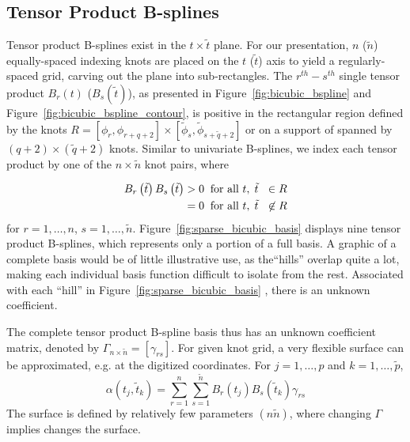 \documentclass[12pt]{article}
\newcommand*\outlineskeleton{\color{green}}
\begin{document}
\subsection{{\outlineskeleton Tensor Product B-splines}}

Tensor product B-splines exist in the $t \times \tilde{t}$ plane. For our presentation, $n$ ($\tilde{n}$) equally-spaced indexing knots are placed on the $t$ ($\tilde{t}$) axis to yield a regularly-spaced grid, carving out the plane into sub-rectangles. The $r^{th}-s^{th}$ single tensor product $B_r\left(t\right)$ ($B_s\left(\tilde{t}\right)$), as presented in Figure~\ref{fig:bicubic_bspline} and Figure~\ref{fig:bicubic_bspline_contour}, is positive in the rectangular region defined by the knots $R = \left[\phi_r, \phi_{r+q+2}\right] \times \left[\tilde{\phi}_s, \tilde{\phi}_{s+\tilde{q}+2}\right]$ or on a support of spanned by $\left(q + 2\right) \times \left(\tilde{q} + 2\right)$ knots. Similar to univariate B-splines, we index each tensor product by one of the $n\times\tilde{n}$ knot pairs, where

\begin{equation} \nonumber
\begin{split}
B_r\left(\tilde{t}\right)B_s\left(\tilde{t}\right) & > 0 \;\; \textup{for all }  t,\; \tilde{t}\;\ \in R\\
 & = 0 \;\; \textup{for all }  t,\; \tilde{t}\;\ \not\in R
\end{split}
\end{equation}
\noindent
for $r = 1,\dots, n$, $s = 1,\dots, \tilde{n}$. Figure~\ref{fig:sparse_bicubic_basis} displays nine tensor product B-splines, which represents only a portion of a full basis. A graphic of a complete basis would be of little illustrative use, as the``hills'' overlap quite a lot, making each individual basis function difficult to isolate from the rest. Associated with each ``hill'' in Figure~\ref{fig:sparse_bicubic_basis} , there is an unknown coefficient. 

The complete tensor product B-spline basis thus has an unknown coefficient matrix, denoted by $\Gamma_{n\times\tilde{n}} = \left[\gamma_{rs}\right]$. For given knot grid, a very flexible surface can be approximated, e.g. at the digitized coordinates. For $j=1,\dots,p$ and $k=1,\dots,\tilde{p}$,
\begin{equation} \label{eq:coefficient_surface_expansion}
\alpha\left(t_{j}, \tilde{t}_{k}\right) = \sum_{r=1}^n \sum_{s=1}^{\tilde{n}}  B_r\left(t_{j}\right) B_s\left(\tilde{t}_{k}\right) \gamma_{rs}
\end{equation}
\noindent
The surface is defined by relatively few parameters $\left(n \tilde{n} \right)$, where changing $\Gamma$ implies changes the surface.
\end{document}
